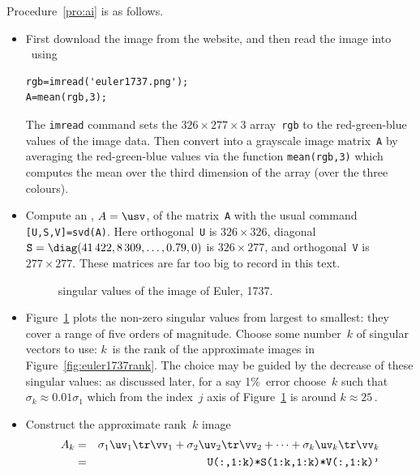\begin{example}
\begin{solution}
Procedure~\ref{pro:ai} is as follows.
\begin{itemize}
\item First download the image from the website, and then read the image into \script\ using 
\begin{verbatim}
rgb=imread('euler1737.png');
A=mean(rgb,3);
\end{verbatim}
The \verb|imread| command sets the \(326\times277\times3\) array~\verb|rgb| to the red-green-blue values of the image data. 
Then convert into a grayscale image matrix~\verb|A| by averaging the red-green-blue values via the function \verb|mean(rgb,3)| which computes the mean over the third dimension of the array (over the three colours).

\item Compute an \svd, \(A=\usv\), of the matrix~\verb|A| with the usual command \verb|[U,S,V]=svd(A)|.
Here orthogonal~\verb|U| is \(326\times326\), diagonal \(\verb|S|=\diag(41\,422, 8\,309,  \ldots,0.79,0)\) is \(326\times277\), and orthogonal~\verb|V| is \(277\times277\).
These matrices are far too big to record in this text.
\setbox\ajrqrbox\hbox{}%
\marginpar{\usebox{\ajrqrbox\\[2ex]}}%


\begin{figure}
\caption{singular values of the image of Euler, 1737.}
\label{fig:euler1737sing}
\centering

\end{figure}
\item Figure~\ref{fig:euler1737sing} plots the non-zero singular values from largest to smallest: they cover a range of five orders of magnitude.
Choose some number~\(k\) of singular vectors to use: \(k\)~is the rank of the approximate images in Figure~\ref{fig:euler1737rank}.
The choice may be guided by the decrease of these singular values: as discussed later, for a say 1\%~error choose~\(k\) such that \(\sigma_k\approx 0.01\sigma_1\) which from the index~\(j\) axis of Figure~\ref{fig:euler1737sing} is around \(k\approx 25\)\,.

\item Construct the approximate rank~\(k\) image
\begin{eqnarray*}
A_k&=&\sigma_1\uv_1\tr\vv_1+\sigma_2\uv_2\tr\vv_2+\cdots+\sigma_k\uv_k\tr\vv_k
\\&=&\verb|U(:,1:k)*S(1:k,1:k)*V(:,1:k)'|
\end{eqnarray*}


\end{itemize}
\end{solution}
\end{example}

